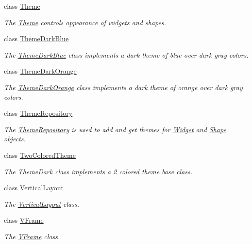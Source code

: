 \begin{DoxyCompactItemize}
class \hyperlink{classcanvascv_1_1Theme}{Theme}
\begin{DoxyCompactList}\small\item\em The \hyperlink{classcanvascv_1_1Theme}{Theme} controls appearance of widgets and shapes. \end{DoxyCompactList}\item 
class \hyperlink{classcanvascv_1_1ThemeDarkBlue}{Theme\+Dark\+Blue}
\begin{DoxyCompactList}\small\item\em The \hyperlink{classcanvascv_1_1ThemeDarkBlue}{Theme\+Dark\+Blue} class implements a dark theme of blue over dark gray colors. \end{DoxyCompactList}\item 
class \hyperlink{classcanvascv_1_1ThemeDarkOrange}{Theme\+Dark\+Orange}
\begin{DoxyCompactList}\small\item\em The \hyperlink{classcanvascv_1_1ThemeDarkOrange}{Theme\+Dark\+Orange} class implements a dark theme of orange over dark gray colors. \end{DoxyCompactList}\item 
class \hyperlink{classcanvascv_1_1ThemeRepository}{Theme\+Repository}
\begin{DoxyCompactList}\small\item\em The \hyperlink{classcanvascv_1_1ThemeRepository}{Theme\+Repository} is used to add and get themes for \hyperlink{classcanvascv_1_1Widget}{Widget} and \hyperlink{classcanvascv_1_1Shape}{Shape} objects. \end{DoxyCompactList}\item 
class \hyperlink{classcanvascv_1_1TwoColoredTheme}{Two\+Colored\+Theme}
\begin{DoxyCompactList}\small\item\em The Theme\+Dark class implements a 2 colored theme base class. \end{DoxyCompactList}\item 
class \hyperlink{classcanvascv_1_1VerticalLayout}{Vertical\+Layout}
\begin{DoxyCompactList}\small\item\em The \hyperlink{classcanvascv_1_1VerticalLayout}{Vertical\+Layout} class. \end{DoxyCompactList}\item 
class \hyperlink{classcanvascv_1_1VFrame}{V\+Frame}
\begin{DoxyCompactList}\small\item\em The \hyperlink{classcanvascv_1_1VFrame}{V\+Frame} class. \end{DoxyCompactList}\item 

\end{DoxyCompactItemize}
